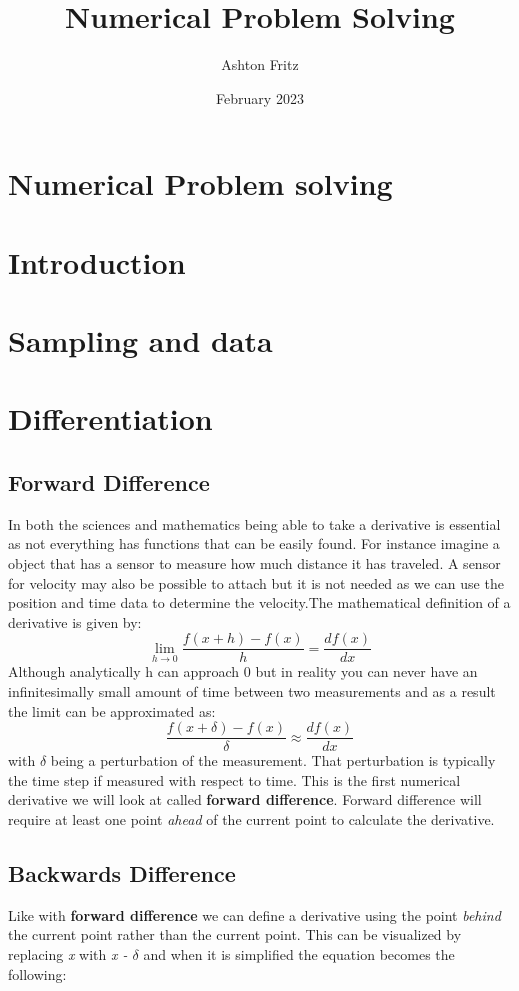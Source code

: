 \documentclass{article}
\title{Numerical Problem Solving}
\author{Ashton Fritz}
\date{February 2023}
\begin{document}
\maketitle

\section*{Numerical Problem solving}
\section{Introduction}

\section{Sampling and data}

\section{Differentiation}
\subsection{Forward Difference}
In both the sciences and mathematics being able to take a derivative is essential as not everything has functions that can be easily found. For instance imagine a object that has a sensor to measure how much distance it has traveled. A sensor for velocity may also be possible to attach but it is not needed as we can use the position and time data to determine the velocity.The mathematical definition of a derivative is given by: 
\begin{equation}
\lim_{h\to 0} \frac{f(x+h)-f(x)}{h} = \frac{df(x)}{dx} 
\end{equation}
Although analytically h can approach 0 but in reality you can never have an infinitesimally small amount of time between two measurements and as a result the limit can be approximated as: 
\begin{equation}
\frac{f(x+\delta)-f(x)}{\delta} \approx \frac{df(x)}{dx} 
\end{equation} 
with $\delta$ being a perturbation of the measurement. That perturbation is typically the time step if measured with respect to time. This is the first numerical derivative we will look at called \textbf{forward difference}. Forward difference will require at least one point \emph{ahead} of the current point to calculate the derivative.

\subsection{Backwards Difference}
Like with \textbf{forward difference} we can define a derivative using the point \emph{behind} the current point rather than the current point. This can be visualized by replacing \emph{x} with \emph{x - $\delta$} and when it is simplified the equation becomes the following:
\end{document}
